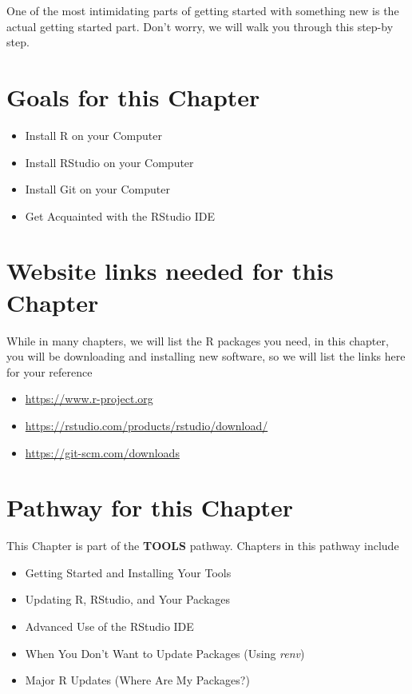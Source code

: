 \documentclass[]{book}
\providecommand{\tightlist}{%
  \setlength{\itemsep}{0pt}\setlength{\parskip}{0pt}}
\begin{document}
One of the most intimidating parts of getting started with something new is the actual getting started part. Don't worry, we will walk you through this step-by step.

\hypertarget{goals-for-this-chapter}{%
\section{Goals for this Chapter}\label{goals-for-this-chapter}}

\begin{itemize}
\tightlist
\item
  Install R on your Computer
\item
  Install RStudio on your Computer
\item
  Install Git on your Computer
\item
  Get Acquainted with the RStudio IDE
\end{itemize}

\hypertarget{website-links-needed-for-this-chapter}{%
\section{Website links needed for this Chapter}\label{website-links-needed-for-this-chapter}}

While in many chapters, we will list the R packages you need, in this chapter, you will be downloading and installing new software, so we will list the links here for your reference

\begin{itemize}
\tightlist
\item
  \url{https://www.r-project.org}
\item
  \url{https://rstudio.com/products/rstudio/download/}
\item
  \url{https://git-scm.com/downloads}
\end{itemize}

\hypertarget{pathway-for-this-chapter}{%
\section{Pathway for this Chapter}\label{pathway-for-this-chapter}}

This Chapter is part of the \textbf{TOOLS} pathway.
Chapters in this pathway include

\begin{itemize}
\tightlist
\item
  Getting Started and Installing Your Tools
\item
  Updating R, RStudio, and Your Packages
\item
  Advanced Use of the RStudio IDE
\item
  When You Don't Want to Update Packages (Using \emph{renv})
\item
  Major R Updates (Where Are My Packages?)
\end{itemize}
\end{document}
